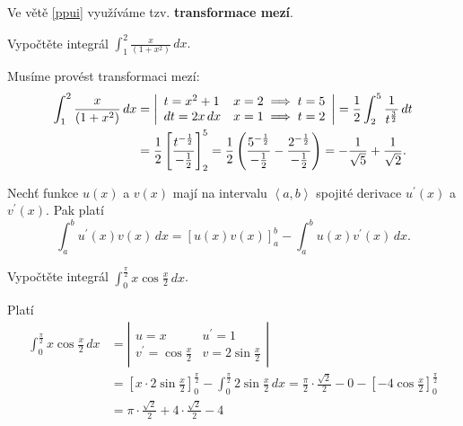\begin{pozn}
    Ve větě \ref{ppui} využíváme tzv. \textbf{transformace mezí}.
\end{pozn}

\begin{priklad}
Vypočtěte integrál $\int _1^2 \frac{x}{(1+x^2)}\, dx.$
\end{priklad}

\begin{reseni}
Musíme provést transformaci mezí:
\begin{align*}
\int _1^2 \frac{x}{(1+x^2)}\, dx &= \left |\begin{array}{l l}
    t=x^2+1 & x=2\implies t=5 \\
    dt = 2x \, dx & x=1\implies t=2
\end{array}\right | = \frac{1}{2}\int _2^5 \frac{1}{t^{\frac{3}{2}}}\, dt \\
&= \frac{1}{2}\left [ \frac{t^{-\frac{1}{2}}}{-\frac{1}{2}} \right ] _2^5 = \frac{1}{2}\left ( \frac{5^{-\frac{1}{2}}}{-\frac{1}{2}}-\frac{2^{-\frac{1}{2}}}{-\frac{1}{2}} \right )=-\frac{1}{\sqrt{5} }+\frac{1}{\sqrt{2} }.
\end{align*}
\end{reseni}

\begin{veta}
Nechť funkce $u(x)$ a $v(x)$ mají na intervalu $\left < a,b \right > $ spojité derivace
$u^\prime (x)$ a $v^\prime (x)$. Pak platí
$$\int_a ^b u^\prime (x)v(x)\, dx = \left [ u(x)v(x) \right ]_a^b -\int _a^b u(x)v^\prime(x)\,dx.$$
\end{veta}

\begin{priklad}
Vypočtěte integrál $\int _0^{\frac{\pi}{2}}x \cos \frac{x}{2}\, dx$.
\end{priklad}

\begin{reseni}
Platí
\begin{align*}
\int _0^{\frac{\pi}{2}}x \cos \frac{x}{2}\, dx &= \left | \begin{array}{ll}
    u=x & u^\prime = 1 \\
    v^\prime = \cos \frac{x}{2} & v = 2\sin \frac{x}{2}
\end{array}   \right | \\
& =\left [ x\cdot2\sin \frac{x}{2} \right ]_0^{\frac{\pi}{2}}-\int_0^{\frac{\pi}{2}}2\sin \frac{x}{2}\, dx =\frac{\pi}{2}\cdot \frac{\sqrt{2} }{2}-0-\left [ -4\cos \frac{x}{2} \right ]_0^{\frac{\pi}{2}}\\
&= \pi \cdot \frac{\sqrt{2} }{2}+4\cdot \frac{\sqrt{2} }{2}-4
\end{align*}
\end{reseni}

